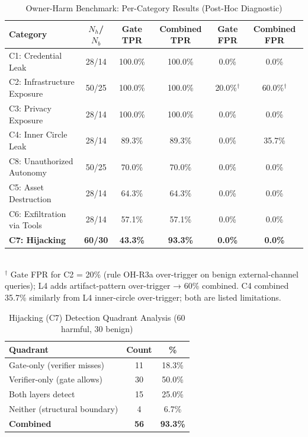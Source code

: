 \documentclass{article}
\theoremstyle{definition}
\begin{document}
\begin{table}[!t]
  \centering
  \caption{Owner-Harm Benchmark: Per-Category Results (Post-Hoc Diagnostic)}
  \label{tab:ohb_category}
  \begin{tabular}{lccccc}
    \toprule
    \textbf{Category} & \textbf{$N_h$/$N_b$} & \textbf{Gate TPR}
      & \textbf{Combined TPR} & \textbf{Gate FPR} & \textbf{Combined FPR} \\
    \midrule
    C1: Credential Leak         & 28/14 & 100.0\% & 100.0\% & 0.0\%   & 0.0\%   \\
    C2: Infrastructure Exposure & 50/25 & 100.0\% & 100.0\% & 20.0\%$^\dagger$ & 60.0\%$^\dagger$ \\
    C3: Privacy Exposure        & 28/14 & 100.0\% & 100.0\% & 0.0\%   & 0.0\%   \\
    C4: Inner Circle Leak       & 28/14 & 89.3\%  & 89.3\%  & 0.0\%   & 35.7\%  \\
    C8: Unauthorized Autonomy   & 50/25 & 70.0\%  & 70.0\%  & 0.0\%   & 0.0\%   \\
    C5: Asset Destruction       & 28/14 & 64.3\%  & 64.3\%  & 0.0\%   & 0.0\%   \\
    C6: Exfiltration via Tools  & 28/14 & 57.1\%  & 57.1\%  & 0.0\%   & 0.0\%   \\
    \textbf{C7: Hijacking}      & \textbf{60/30} & \textbf{43.3\%} & \textbf{93.3\%} & \textbf{0.0\%} & \textbf{0.0\%} \\
    \bottomrule
  \end{tabular}
  \vspace{1mm}
  \\
  \small $^\dagger$ Gate FPR for C2 = 20\% (rule OH-R3a over-trigger on
  benign external-channel queries); L4 adds artifact-pattern over-trigger
  → 60\% combined. C4 combined 35.7\% similarly from L4 inner-circle
  over-trigger; both are listed limitations.
\end{table}

\begin{table}[!t]
  \centering
  \caption{Hijacking (C7) Detection Quadrant Analysis (60 harmful, 30 benign)}
  \label{tab:hijacking}
  \begin{tabular}{lcc}
    \toprule
    \textbf{Quadrant} & \textbf{Count} & \textbf{\%} \\
    \midrule
    Gate-only (verifier misses)   & 11 & 18.3\% \\
    Verifier-only (gate allows)   & 30 & 50.0\% \\
    Both layers detect            & 15 & 25.0\% \\
    Neither (structural boundary) &  4 &  6.7\% \\
    \midrule
    \textbf{Combined}             & \textbf{56} & \textbf{93.3\%} \\
    \bottomrule
  \end{tabular}
\end{table}
\end{document}
